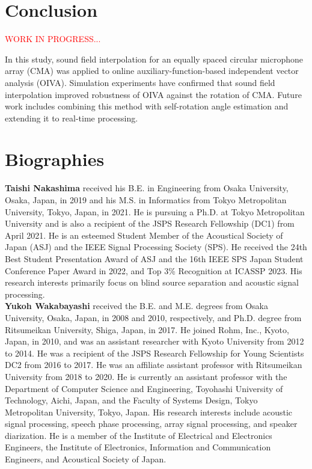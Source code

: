 \documentclass[sip,biber]{now-journal}
\newcommand{\todo}[1]{\textcolor{red}{#1}}
\begin{document}
\section{Conclusion}\label{sec:conclusion}
\todo{WORK IN PROGRESS...}

In this study, sound field interpolation for an equally spaced circular microphone array (CMA) was applied to online auxiliary-function-based independent vector analysis (OIVA).
Simulation experiments have confirmed that sound field interpolation improved robustness of OIVA against the rotation of CMA.
Future work includes combining this method with self-rotation angle estimation \cite{Lian:2021:APSIPA} and extending it to real-time processing.

\section*{Biographies}

\noindent\normalsize\textbf{Taishi Nakashima}
received his B.E. in Engineering from Osaka University, Osaka, Japan, in 2019 and his M.S. in Informatics from Tokyo Metropolitan University, Tokyo, Japan, in 2021.
He is pursuing a Ph.D. at Tokyo Metropolitan University and is also a recipient of the JSPS Research Fellowship (DC1) from April 2021.
He is an esteemed Student Member of the Acoustical Society of Japan (ASJ) and the IEEE Signal Processing Society (SPS).
He received the 24th Best Student Presentation Award of ASJ and the 16th IEEE SPS Japan Student Conference Paper Award in 2022, and Top 3\% Recognition at ICASSP 2023.
His research interests primarily focus on blind source separation and acoustic signal processing.
\\

\noindent\normalsize\textbf{Yukoh Wakabayashi}
received the B.E. and M.E. degrees from Osaka University, Osaka, Japan, in 2008 and 2010, respectively, and Ph.D. degree from Ritsumeikan University, Shiga, Japan, in 2017.
He joined Rohm, Inc., Kyoto, Japan, in 2010, and was an assistant researcher with Kyoto University from 2012 to 2014.
He was a recipient of the JSPS Research Fellowship for Young Scientists DC2 from 2016 to 2017.
He was an affiliate assistant professor with Ritsumeikan University from 2018 to 2020.
He is currently an assistant professor with the Department of Computer Science and Engineering, Toyohashi University of Technology, Aichi, Japan, and the Faculty of Systems Design, Tokyo Metropolitan University, Tokyo, Japan.
His research interests include acoustic signal processing, speech phase processing, array signal processing, and speaker diarization.
He is a member of the Institute of Electrical and Electronics Engineers, the Institute of Electronics, Information and Communication Engineers, and Acoustical Society of Japan.
\\
\end{document}

